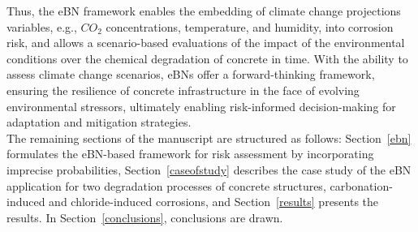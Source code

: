 Thus, the eBN framework enables the embedding of climate change projections variables, e.g., $CO_2$ concentrations, temperature, and humidity, into corrosion risk, and allows a scenario-based evaluations of the impact of the environmental conditions over the chemical degradation of concrete in time.
With the ability to assess climate change scenarios, eBNs offer a forward-thinking framework, ensuring the resilience of concrete infrastructure in the face of evolving environmental stressors, ultimately enabling risk-informed decision-making for adaptation and mitigation strategies.\\

The remaining sections of the manuscript are structured as follows: Section~\ref{ebn} formulates the eBN-based framework for risk assessment by incorporating imprecise probabilities, Section~\ref{caseofstudy} describes the case study of the eBN application for two degradation processes of concrete structures, carbonation-induced and chloride-induced corrosions, and Section~\ref{results} presents the results. In Section~\ref{conclusions}, conclusions are drawn.

